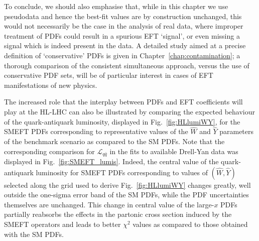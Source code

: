\documentclass[withindex,glossary]{cam-thesis}
\begin{document}
  To conclude, we should also emphasise that, while in this chapter we use pseudodata
and hence the best-fit values are by construction unchanged, this
would not necessarily be the case in the analysis of real data, where
improper treatment of PDFs could result in a spurious EFT `signal', or
even missing a signal which is indeed present in the data. A detailed
study aimed at a precise definition of `conservative' PDFs is given in Chapter~\ref{chap:contamination}; 
a thorough comparison of the consistent
simultaneous approach, versus the use of conservative PDF sets, will
be of particular interest in cases of EFT manifestations of new
physics.

The increased role that the interplay between PDFs and EFT coefficients
will play at the HL-LHC can also be illustrated by
comparing the expected behaviour of the quark-antiquark
luminosity, displayed in Fig.~\ref{fig:HLlumiWY},
for the SMEFT PDFs corresponding
to representative values of the $\hat{W}$ and $\hat{Y}$ parameters of the benchmark scenario
as compared to the  SM PDFs.
%
Note that the corresponding comparison for $\mathcal{L}_{q\bar{q}}$ 
in the fits to available Drell-Yan data
    was displayed in Fig.~\ref{fig:SMEFT_lumis}.
%
    Indeed, the central value of the quark-antiquark luminosity
    for SMEFT PDFs corresponding to values of $(\hat{W},\hat{Y})$ selected along the grid used
    to derive
Fig.~\ref{fig:HLlumiWY} changes greatly, well
outside the one-sigma error band of the SM PDFs, while the
PDF uncertainties themselves are unchanged. 
%
This change in central value of the large-$x$ PDFs partially reabsorbs the effects in the
partonic cross section induced by the SMEFT operators and leads to better
$\chi^2$ values as compared to those obtained with the SM PDFs.
\end{document}

